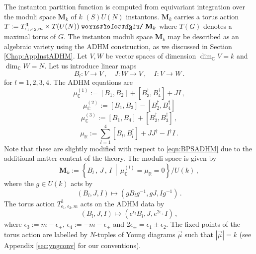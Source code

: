\documentclass[main.tex]{subfiles}
\begin{document}
The instanton partition function is computed from equivariant integration over the moduli space $\mathbf{M}_{k}$ of $k$ $(S)U(N)$ instantons.  $\mathbf{M}_{k}$ carries a torus action $T:=T^3_{\epsilon_1,\epsilon_2,m}\times T(U(N))\acts \mathbf{M}_{k}$ where $T(G)$ denotes a maximal torus of $G$. The instanton moduli space $\mathbf{M}_{k}$ may be described as an algebraic variety using the ADHM construction, as we discussed in Section \ref{Chap:AppInstADHM}.  Let $V,W$ be vector spaces of dimension $\dim_{\mathbb{C}}V=k$ and $\dim_{\mathbb{C}}W=N$.  Let us introduce linear maps \begin{equation}
B_l:V\to V\,,\quad J:W\to V\,,\quad I:V\to W\,.
\end{equation}
for $l=1,2,3,4$.  The ADHM equations are
\begin{equation}
\mu^{(1)}_{\mathbb{C}}:=[B_1,B_2]+[B_3^{\dagger},B_4^{\dagger}]+JI\,,\label{eqn:ADHM1}
\end{equation}
\begin{equation}
\mu^{(2)}_{\mathbb{C}}:=[B_1,B_3]-[B_2^{\dagger},B_4^{\dagger}]
\end{equation}
\begin{equation}
\mu^{(3)}_{\mathbb{C}}:=[B_1,B_4]+[B_2^{\dagger},B_3^{\dagger}]\,,
\end{equation}
\begin{equation}
\mu_{\mathbb{R}}:=\sum_{l=1}^4[B_l,B_l^{\dagger}]+JJ^{\dagger}-I^{\dagger}I\,.\label{eqn:ADHM2}
\end{equation}
Note that these are slightly modified with respect to \eqref{eqn:BPSADHM} due to the additional matter content of the theory.
The moduli space is given by
\begin{equation}
\mathbf{M}_{k}:=\left\{B_l\,,\,J\,,\,I\,\middle|\,\mu_{\mathbb{C}}^{(i)}=\mu_{\mathbb{R}}=0\right\}\slash U(k)\,,
\end{equation}
where the $g\in U(k)$ acts by
\begin{equation}\label{eqn:Ukaction}
\left(B_l,J,I\right)\mapsto\left(gB_lg^{-1},gJ,Ig^{-1}\right)\,.
\end{equation}
The torus action $T^3_{\epsilon_1,\epsilon_2,m}$ acts on the ADHM data by
\begin{equation}
\left(B_l,J,I\right)\mapsto(e^{\epsilon_l} B_l,J,e^{2\epsilon_+}I)\,,
\end{equation}
where $\epsilon_3:=m-\epsilon_+$, $\epsilon_4:=-m-\epsilon_+$ and $2\epsilon_{\pm}=\epsilon_1\pm\epsilon_2$.
The fixed points of the torus action are labelled by $N$-tuples of Young diagrams $\vec{\mu}$ such that $|\vec{\mu}|=k$ (see Appendix \ref{sec:yngconv} for our conventions).  
\end{document}
